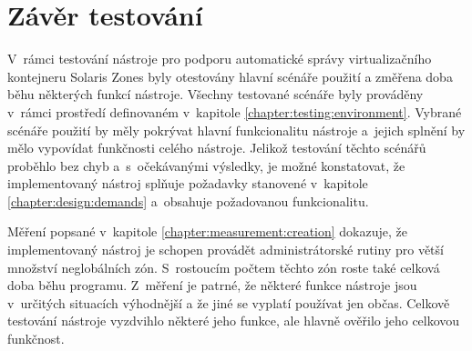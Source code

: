 \section{Závěr testování}
\label{chapter:testing:scenario:conclusion}
V~rámci testování nástroje pro podporu automatické správy virtualizačního kontejneru Solaris Zones byly otestovány hlavní scénáře
použití a změřena doba běhu některých funkcí nástroje. Všechny testované scénáře byly prováděny v~rámci prostředí definovaném v~kapitole
\ref{chapter:testing:environment}. Vybrané scénáře použití by měly pokrývat hlavní funkcionalitu nástroje a~jejich splnění by mělo
vypovídat funkčnosti celého nástroje. Jelikož testování těchto scénářů proběhlo bez chyb a~s~očekávanými výsledky, je možné konstatovat,
že implementovaný nástroj splňuje požadavky stanovené v~kapitole \ref{chapter:design:demands} a~obsahuje požadovanou funkcionalitu.

Měření popsané v~kapitole \ref{chapter:measurement:creation} dokazuje, že implementovaný nástroj je schopen provádět administrátorské
rutiny pro větší množství neglobálních zón. S~rostoucím počtem těchto zón roste také celková doba běhu programu. Z~měření je patrné,
že některé funkce nástroje jsou v~určitých situacích výhodnější a že jiné se vyplatí používat jen občas. Celkově testování nástroje
vyzdvihlo některé jeho funkce, ale hlavně ověřilo jeho celkovou funkčnost.